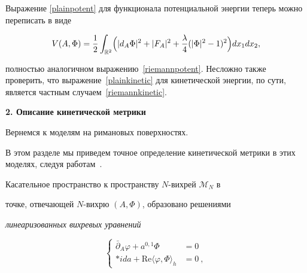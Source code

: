 Выражение \eqref{plainpotent} для функционала потенциальной энергии теперь можно переписать в виде

\begin{equation}

\label{plainpotent2}

V(A,\Phi)=\dfrac12\int _{\mathbb

R^2}\Bigl(|d_A\Phi|^2+|F_A|^2+

\frac{\lambda}4(|\Phi|^2-1)^2\Bigr)dx_1dx_2, 

\end{equation}

полностью аналогичном выражению~\eqref{riemannpotent}. Несложно также проверить, что выражение~\eqref{plainkinetic} для кинетической энергии, по сути, является частным случаем~\eqref{riemannkinetic}. 



\smallskip



\hypertarget{kineticmetric}{}



\textbf{2. Описание кинетической метрики}





Вернемся к моделям на римановых поверхностях. 

В этом разделе мы приведем точное определение кинетической метрики в этих моделях, следуя работам~\cite{palv:st,  palv:palvelev1}. 



Касательное пространство к пространству $N$-вихрей $\mathcal M_N$ в

точке, отвечающей $N$-вихрю $(A,\Phi)$, образовано решениями

\textit{линеаризованных вихревых уравнений}

\begin{equation}

\label{lin-vor} 

\left\{ 

\begin{aligned}

\bar\partial_A\varphi + a^{0, 1}\Phi &= 0 \\

*ida + \text{Re}\langle\varphi,\Phi\rangle_h &= 0\ ,

\end{aligned}

\right.

\end{equation}

